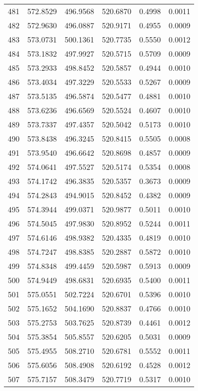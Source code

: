 \documentclass{article}
\begin{document}
\begin{longtable}{|c|c|c|c|c|c|}
481 & 572.8529 & 496.9568 & 520.6870 & 0.4998 & 0.0011 \\
482 & 572.9630 & 496.0887 & 520.9171 & 0.4955 & 0.0009 \\
483 & 573.0731 & 500.1361 & 520.7735 & 0.5550 & 0.0012 \\
484 & 573.1832 & 497.9927 & 520.5715 & 0.5709 & 0.0009 \\
485 & 573.2933 & 498.8452 & 520.5857 & 0.4944 & 0.0010 \\
486 & 573.4034 & 497.3229 & 520.5533 & 0.5267 & 0.0009 \\
487 & 573.5135 & 496.5874 & 520.5477 & 0.4881 & 0.0010 \\
488 & 573.6236 & 496.6569 & 520.5524 & 0.4607 & 0.0010 \\
489 & 573.7337 & 497.4357 & 520.5042 & 0.5173 & 0.0010 \\
490 & 573.8438 & 496.3245 & 520.8415 & 0.5505 & 0.0008 \\
491 & 573.9540 & 496.6642 & 520.8698 & 0.4857 & 0.0009 \\
492 & 574.0641 & 497.5527 & 520.5174 & 0.5354 & 0.0008 \\
493 & 574.1742 & 496.3835 & 520.5357 & 0.3673 & 0.0009 \\
494 & 574.2843 & 494.9015 & 520.8452 & 0.4382 & 0.0009 \\
495 & 574.3944 & 499.0371 & 520.9877 & 0.5011 & 0.0010 \\
496 & 574.5045 & 497.9830 & 520.8952 & 0.5244 & 0.0011 \\
497 & 574.6146 & 498.9382 & 520.4335 & 0.4819 & 0.0010 \\
498 & 574.7247 & 498.8385 & 520.2887 & 0.5872 & 0.0010 \\
499 & 574.8348 & 499.4459 & 520.5987 & 0.5913 & 0.0009 \\
500 & 574.9449 & 498.6831 & 520.6935 & 0.5400 & 0.0011 \\
501 & 575.0551 & 502.7224 & 520.6701 & 0.5396 & 0.0010 \\
502 & 575.1652 & 504.1690 & 520.8837 & 0.4766 & 0.0010 \\
503 & 575.2753 & 503.7625 & 520.8739 & 0.4461 & 0.0012 \\
504 & 575.3854 & 505.8557 & 520.6205 & 0.5031 & 0.0009 \\
505 & 575.4955 & 508.2710 & 520.6781 & 0.5552 & 0.0011 \\
506 & 575.6056 & 508.4908 & 520.6192 & 0.4528 & 0.0012 \\
507 & 575.7157 & 508.3479 & 520.7719 & 0.5317 & 0.0010 \\

\end{longtable}
\end{document}
